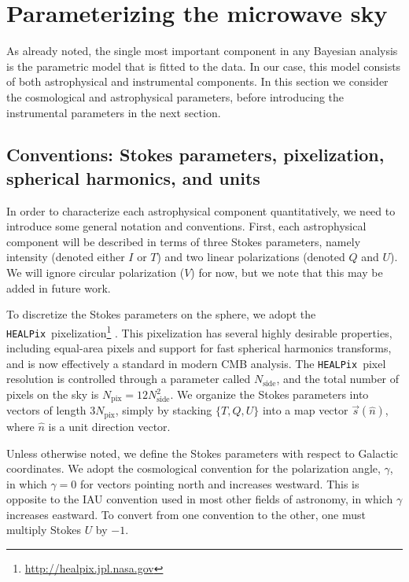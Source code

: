 \documentclass[twocolumn]{aa}
\newcommand{\s}[0]{\vec{s}}
\newcommand{\HEALPix}[0]{\texttt{HEALPix}}
\begin{document}
\section{Parameterizing the microwave sky}
\label{sec:sky}

As already noted, the single most important component in any Bayesian
analysis is the parametric model that is fitted to the data. In our
case, this model consists of both astrophysical and instrumental
components. In this section we consider the cosmological and
astrophysical parameters, before introducing the instrumental
parameters in the next section.

\subsection{Conventions: Stokes parameters, pixelization, spherical harmonics, and units}
\label{sec:units}

In order to characterize each astrophysical component quantitatively,
we need to introduce some general notation and conventions. First,
each astrophysical component will be described in terms of three
Stokes parameters, namely intensity (denoted either $I$ or $T$) and
two linear polarizations (denoted $Q$ and $U$). We will ignore
circular polarization ($V$) for now, but we note that this may be
added in future work.

To discretize the Stokes parameters on the sphere, we adopt the
\HEALPix\ pixelization\footnote{\url{http://healpix.jpl.nasa.gov}}
\citep{gorski2005}. This pixelization has several highly desirable
properties, including equal-area pixels and support for fast spherical
harmonics transforms, and is now effectively a standard in modern CMB
analysis. The \HEALPix\ pixel resolution is controlled through a
parameter called $N_{\mathrm{side}}$, and the total number of pixels
on the sky is $N_{\mathrm{pix}}=12N_{\mathrm{side}}^2$. We organize
the Stokes parameters into vectors of length $3N_{\mathrm{pix}}$,
simply by stacking $\{T,Q,U\}$ into a map vector $\s(\hat{n})$, where
$\hat{n}$ is a unit direction vector.

Unless otherwise noted, we define the Stokes parameters with respect
to Galactic coordinates. We adopt the cosmological convention for the
polarization angle, $\gamma$, in which $\gamma=0$ for vectors pointing
north and increases westward. This is opposite to the IAU convention
used in most other fields of astronomy, in which $\gamma$ increases
eastward. To convert from one convention to the other, one must
multiply Stokes $U$ by $-1$.
\end{document}
